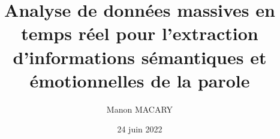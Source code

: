 





\author{Manon MACARY}

\title{Analyse de données massives en temps réel pour l’extraction d’informations sémantiques et émotionnelles de la parole}

\date{24 juin 2022}


\numthese{}

